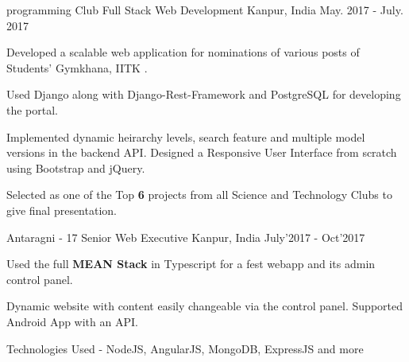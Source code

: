 \begin{cventries}
 \cventry
    {programming Club}
    {Full Stack Web Development}
    {Kanpur, India}
    {May. 2017 - July. 2017}
    {
      \begin{cvitems}
        \item Developed a scalable web application for nominations of various posts of Students' Gymkhana, IITK .
        \item Used Django along with Django-Rest-Framework and PostgreSQL for developing the portal.  
        \item	Implemented dynamic heirarchy levels, search feature and multiple model versions in the backend API. Designed a Responsive User Interface from scratch using Bootstrap and jQuery.
        \item Selected as one of the Top \textbf{6} projects from all Science and Technology Clubs to give final presentation.
      \end{cvitems}
    }
    
  \cventry
  {Antaragni - 17}
  {Senior Web Executive}
  {Kanpur, India}
  {July'2017 - Oct'2017}
  {
    \begin{cvitems}
    \item Used the full \textbf{MEAN Stack} in Typescript for a fest webapp and its admin control panel.
    \item Dynamic website with content easily changeable via the control panel. Supported Android App with an API.
    \item Technologies Used - NodeJS, AngularJS, MongoDB, ExpressJS and more
    \end{cvitems}
  }
  


\end{cventries}


